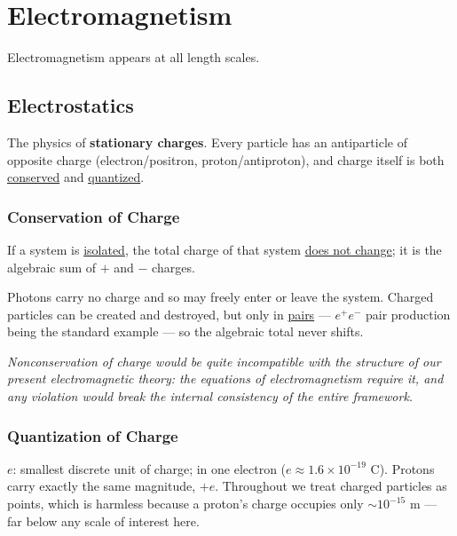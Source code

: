 \chapter{Electromagnetism}

Electromagnetism appears at all length scales.

\section{Electrostatics}

\begin{definition}[Electrostatics]
The physics of \textbf{stationary charges}. Every particle has an antiparticle of opposite charge (electron/positron, proton/antiproton), and charge itself is both \underline{conserved} and \underline{quantized}.
\end{definition}

\subsection{Conservation of Charge}

\begin{theorem}
If a system is \underline{isolated}, the total charge of that system \underline{does not change}; it is the algebraic sum of $+$ and $-$ charges.
\end{theorem}

Photons carry no charge and so may freely enter or leave the system. Charged particles can be created and destroyed, but only in \underline{pairs} --- $e^+e^-$ pair production being the standard example --- so the algebraic total never shifts.

\textit{Nonconservation of charge would be quite incompatible with the structure of our present electromagnetic theory: the equations of electromagnetism require it, and any violation would break the internal consistency of the entire framework.}

\subsection{Quantization of Charge}

\begin{definition}
$e$: smallest discrete unit of charge; in one electron ($e \approx 1.6 \times 10^{-19}$ C). Protons carry exactly the same magnitude, $+e$. Throughout we treat charged particles as points, which is harmless because a proton's charge occupies only $\sim 10^{-15}$ m --- far below any scale of interest here.
\end{definition}

